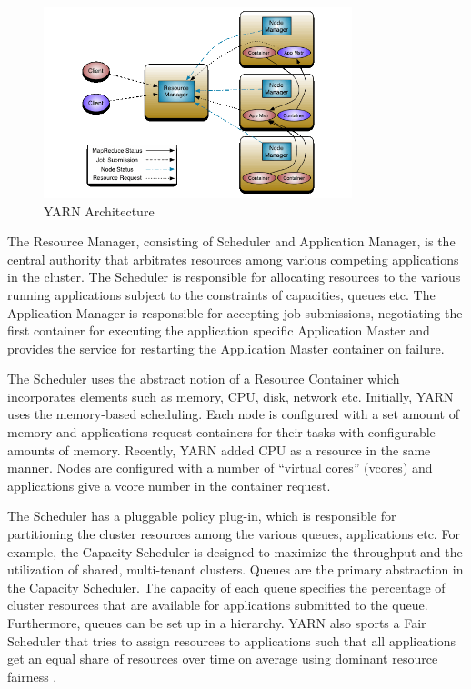 \documentclass[11pt]{book}
\begin{document}
\begin{figure}[t]
\includegraphics[width=0.8\textwidth]{images/yarn-architecture.png}
\centering
\caption{YARN Architecture}
\end{figure}

The Resource Manager, consisting of Scheduler and Application Manager, is the central authority that arbitrates resources among various competing applications in the cluster.
The Scheduler is responsible for allocating resources to the various running applications subject to the constraints of capacities, queues etc.
The Application Manager is responsible for accepting job-submissions, negotiating the first container for executing the application specific Application Master and provides the service for restarting the Application Master container on failure.

The Scheduler uses the abstract notion of a Resource Container which incorporates elements such as memory, CPU, disk, network etc. Initially, YARN uses the memory-based scheduling. Each node is configured with a set amount of memory and applications  request containers for their tasks with configurable amounts of memory. Recently, YARN added CPU as a resource in the same manner. Nodes are configured with a number of ``virtual cores'' (vcores) and applications give a vcore number in the container request.

The Scheduler has a pluggable policy plug-in, which is responsible for partitioning the cluster resources among the various queues, applications etc. For example, the Capacity Scheduler is designed to maximize the throughput and the utilization of shared, multi-tenant clusters.
Queues are the primary abstraction in the Capacity Scheduler. The capacity of each queue specifies the percentage of cluster resources that are available for applications submitted to the queue. Furthermore, queues can be set up in a hierarchy. YARN also sports a Fair Scheduler  that tries to assign resources to applications such that all applications get an equal share of resources over time on average using dominant resource fairness \cite{Ghodsi:2011:DRF}.
\end{document}
